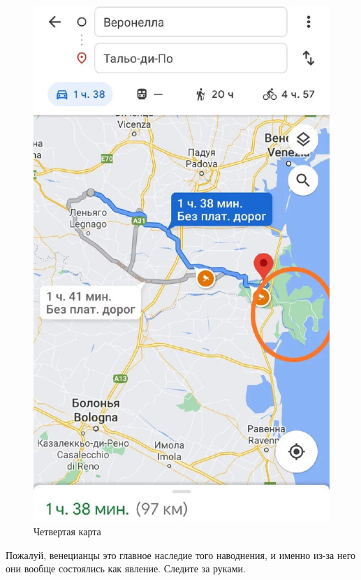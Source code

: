 \begin{figure}[h!tb]
	\centering\includegraphics[scale=0.3]{Data/antic_technocrash/1614663836179610411.jpg}
	\caption{Четвертая карта
	}
	\label{fig:tech4} %
\end{figure}
Пожалуй, венецианцы это главное наследие того наводнения, и именно из-за него они вообще состоялись как явление. Следите за руками.


